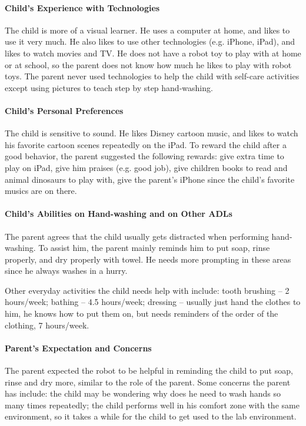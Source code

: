 \paragraph{Child's Experience with Technologies}
The child is more of a visual learner.  He uses a computer at home, and likes to use it very much.  He also likes to use other technologies (e.g. iPhone, iPad), and likes to watch movies and TV.  He does not have a robot toy to play with at home or at school, so the parent does not know how much he likes to play with robot toys.  The parent never used technologies to help the child with self-care activities except using pictures to teach step by step hand-washing.

\paragraph{Child's Personal Preferences}
The child is sensitive to sound.  He likes Disney cartoon music, and likes to watch his favorite cartoon scenes repeatedly on the iPad.  To reward the child after a good behavior, the parent suggested the following rewards: give extra time to play on iPad, give him praises (e.g. good job), give children books to read and animal dinosaurs to play with, give the parent's iPhone since the child's favorite musics are on there.

\paragraph{Child's Abilities on Hand-washing and on Other ADLs}
The parent agrees that the child usually gets distracted when performing hand-washing.  To assist him, the parent mainly reminds him to put soap, rinse properly, and dry properly with towel.  He needs more prompting in these areas since he always washes in a hurry.

Other everyday activities the child needs help with include:  tooth brushing -- 2 hours/week; bathing -- 4.5 hours/week; dressing -- usually just hand the clothes to him, he knows how to put them on, but needs reminders of the order of the clothing, 7 hours/week.

\paragraph{Parent's Expectation and Concerns}
The parent expected the robot to be helpful in reminding the child to put soap, rinse and dry more, similar to the role of the parent.  Some concerns the parent has include: the child may be wondering why does he need to wash hands so many times repeatedly; the child performs well in his comfort zone with the same environment, so it takes a while for the child to get used to the lab environment.

